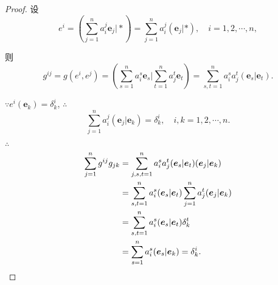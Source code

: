 \documentclass{ctexart}
\begin{document}
\begin{proof}
    设
    \[e^i=\left(\sum\limits_{j=1}^na_i^j\boldsymbol{e}_j\Bigg|*\right)=\sum\limits_{j=1}^na_i^j(\boldsymbol{e}_j|*),\quad i=1,2,\cdots,n,\]

    则
    \[g^{ij}=g(e^i,e^j)=\left(\sum\limits_{s=1}^na_i^s\boldsymbol{e}_s\Bigg|\sum\limits_{t=1}^na_j^t\boldsymbol{e}_t\right)=\sum\limits_{s,t=1}^na_i^sa_j^t(\boldsymbol{e}_s|\boldsymbol{e}_t).\]
    
    $\because e^i(\boldsymbol{e}_k)=\delta^i_k$, $\therefore$
    \[\sum\limits_{j=1}^na_i^j(\boldsymbol{e}_j|\boldsymbol{e}_k)=\delta^i_k,\quad i,k=1,2,\cdots,n.\]

    $\therefore$
    \begin{align*}
        \sum\limits_{j=1}^ng^{ij}g_{jk} & =\sum\limits_{j,s,t=1}^na_i^sa_j^t(\boldsymbol{e}_s|\boldsymbol{e}_t)(\boldsymbol{e}_j|\boldsymbol{e}_k) \\
        & =\sum\limits_{s,t=1}^na_i^s(\boldsymbol{e}_s|\boldsymbol{e}_t)\sum\limits_{j=1}^na_j^t(\boldsymbol{e}_j|\boldsymbol{e}_k) \\
        & =\sum\limits_{s,t=1}^na_i^s(\boldsymbol{e}_s|\boldsymbol{e}_t)\delta^t_k \\
        & =\sum\limits_{s=1}^na_i^s(\boldsymbol{e}_s|\boldsymbol{e}_k)=\delta^i_k.\qedhere
    \end{align*}
\end{proof}
\end{document}
